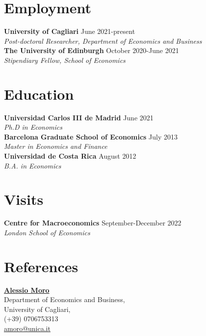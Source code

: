 \documentclass[margin]{res} %
\begin{document}
\begin{resume}

 
\section{Employment}
{\bf University of Cagliari} \hfill June 2021-present  \\
{\sl Post-doctoral Researcher, Department of Economics and Business} \\
{\bf The University of Edinburgh} \hfill October 2020-June 2021  \\
{\sl Stipendiary Fellow, School of Economics} 


\section{Education}
{\bf Universidad Carlos III de Madrid} \hfill June 2021  \\
{\sl Ph.D in Economics} \\
{\bf Barcelona Graduate School of Economics} \hfill July 2013 \\
{\sl Master in Economics and Finance}  \\
{\bf Universidad de Costa Rica} \hfill August 2012 \\
{\sl B.A. in Economics}

\section{Visits}
{\bf Centre for Macroeconomics} \hfill September-December 2022  \\
{\sl London School of Economics}

\section{References}
\begin{multicols}{2}
	\href{http://http://www.alessiomoro.it/}{\bf{Alessio Moro}} \\
	Department of Economics and Business, \\
	University of Cagliari, \\
	(+39) 0706753313 \\
	\href{mailto:amoro@unica.it}{amoro@unica.it}
	

\end{multicols}
\end{resume}
\end{document}
